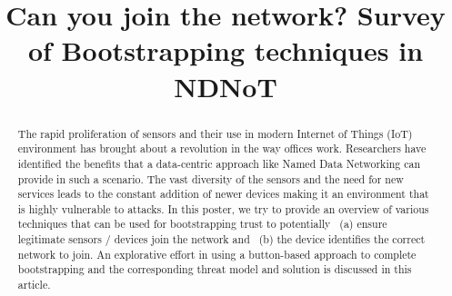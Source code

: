 \documentclass[10pt,sigconf]{acmart}
\begin{document}
\title{Can you join the network? Survey of Bootstrapping techniques in NDNoT}









\begin{abstract}

  The rapid proliferation of sensors and their use in modern Internet of Things (IoT) environment has brought about a revolution in the way offices work.
  Researchers have identified the benefits that a data-centric approach like Named Data Networking can provide in such a scenario.
  The vast diversity of the sensors and the need for new services leads to the constant addition of newer devices making it an environment that is highly vulnerable to attacks. 
  In this poster, we try to provide an overview of various techniques that can be used for bootstrapping trust to potentially ~(a) ensure legitimate sensors / devices join the network and ~(b) the device identifies the correct network to join.
  An explorative effort in using a button-based approach to complete bootstrapping and the corresponding threat model and solution is discussed in this article.
  
\end{abstract}
\end{document}
